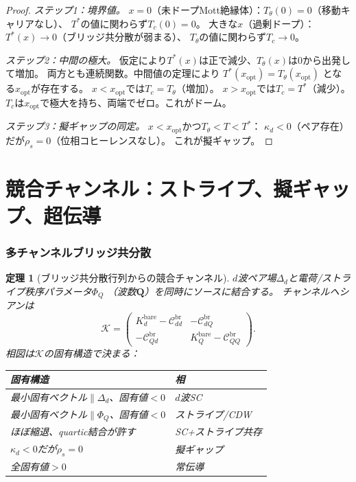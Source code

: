\documentclass[12pt]{article}
\theoremstyle{plain}
\newtheorem{theorem}{定理}[section]
\theoremstyle{definition}
\numberwithin{equation}{section}
\newcommand{\br}{\mathrm{br}}
\begin{document}
\begin{proof}
\emph{ステップ1：境界値。}
$x=0$（未ドープMott絶縁体）：$T_\theta(0)=0$（移動キャリアなし）、
$T^*$の値に関わらず$T_c(0)=0$。
大きな$x$（過剰ドープ）：$T^*(x)\to 0$（ブリッジ共分散が弱まる）、
$T_\theta$の値に関わらず$T_c\to 0$。

\emph{ステップ2：中間の極大。}
仮定により$T^*(x)$は正で減少、$T_\theta(x)$は$0$から出発して増加。
両方とも連続関数。中間値の定理により
$T^*(x_{\mathrm{opt}})=T_\theta(x_{\mathrm{opt}})$
となる$x_{\mathrm{opt}}$が存在する。
$x<x_{\mathrm{opt}}$では$T_c=T_\theta$（増加）。
$x>x_{\mathrm{opt}}$では$T_c=T^*$（減少）。
$T_c$は$x_{\mathrm{opt}}$で極大を持ち、両端でゼロ。これがドーム。

\emph{ステップ3：擬ギャップの同定。}
$x<x_{\mathrm{opt}}$かつ$T_\theta<T<T^*$：
$\kappa_d<0$（ペア存在）だが$\rho_s=0$（位相コヒーレンスなし）。
これが擬ギャップ。
\end{proof}


\part{競合チャンネル：ストライプ、擬ギャップ、超伝導}

\section{多チャンネルブリッジ共分散}\label{sec:competing}

\begin{theorem}[ブリッジ共分散行列からの競合チャンネル]\label{thm:competing}
$d$波ペア場$\Delta_d$と電荷/ストライプ秩序パラメータ$\Phi_Q$
（波数$\bm{Q}$）を同時にソースに結合する。
チャンネルヘシアンは
\begin{equation}
\boxed{\mathcal{K} = \begin{pmatrix}
K_d^{\mathrm{bare}}-\mathcal{C}_{dd}^{\br}
& -\mathcal{C}_{dQ}^{\br}\\
-\mathcal{C}_{Qd}^{\br}
& K_Q^{\mathrm{bare}}-\mathcal{C}_{QQ}^{\br}
\end{pmatrix}.}
\end{equation}
相図は$\mathcal{K}$の固有構造で決まる：
\begin{center}
\begin{tabular}{ll}
\toprule
固有構造 & 相\\
\midrule
最小固有ベクトル$\parallel\Delta_d$、固有値$<0$ & $d$波SC\\
最小固有ベクトル$\parallel\Phi_Q$、固有値$<0$ & ストライプ/CDW\\
ほぼ縮退、quartic結合が許す & SC+ストライプ共存\\
$\kappa_d<0$だが$\rho_s=0$ & 擬ギャップ\\
全固有値$>0$ & 常伝導\\
\bottomrule
\end{tabular}
\end{center}
\end{theorem}
\end{document}
